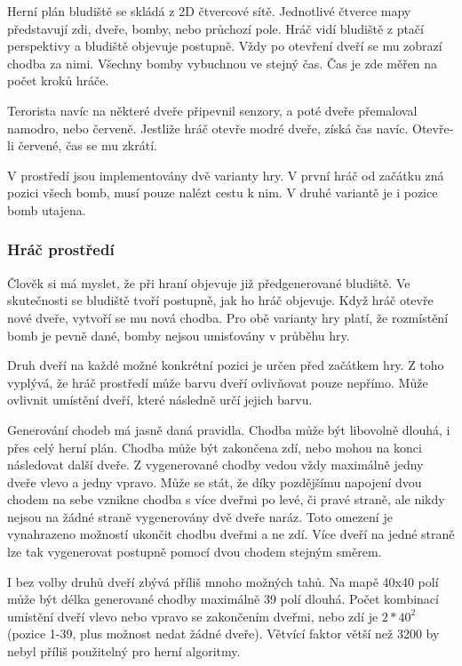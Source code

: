 Herní plán bludiště se skládá z 2D čtvercové sítě. Jednotlivé čtverce mapy představují zdi, dveře, bomby, nebo průchozí pole. Hráč vidí bludiště z ptačí perspektivy a bludiště objevuje postupně. Vždy po otevření dveří se mu zobrazí chodba za nimi. Všechny bomby vybuchnou ve stejný čas. Čas je zde měřen na počet kroků hráče.

Terorista navíc na některé dveře připevnil senzory, a poté dveře přemaloval namodro, nebo červeně. Jestliže hráč otevře modré dveře, získá čas navíc. Otevře-li červené, čas se mu zkrátí.

V prostředí jsou implementovány dvě varianty hry. V první hráč od začátku zná pozici všech bomb, musí pouze nalézt cestu k nim. V druhé variantě je i pozice bomb utajena.

\subsubsection{Hráč prostředí}

Člověk si má myslet, že při hraní objevuje již předgenerované bludiště. Ve skutečnosti se bludiště tvoří postupně, jak ho hráč objevuje. Když hráč otevře nové dveře, vytvoří se mu nová chodba. Pro obě varianty hry platí, že rozmístění bomb je pevně dané, bomby nejsou umisťovány v průběhu hry. 

Druh dveří na každé možné konkrétní pozici je určen před začátkem hry. Z toho vyplývá, že hráč prostředí může barvu dveří ovlivňovat pouze nepřímo. Může ovlivnit umístění dveří, které následně určí jejich barvu.

Generování chodeb má jasně daná pravidla. Chodba může být libovolně dlouhá, i přes celý herní plán. Chodba může být zakončena zdí, nebo mohou na konci následovat další dveře. Z vygenerované chodby vedou vždy maximálně jedny dveře vlevo a jedny vpravo. Může se stát, že díky pozdějšímu napojení dvou chodem na sebe vznikne chodba s více dveřmi po levé, či pravé straně, ale nikdy nejsou na žádné straně vygenerovány dvě dveře naráz. Toto omezení je vynahrazeno možností ukončit chodbu dveřmi a ne zdí. Více dveří na jedné straně lze tak vygenerovat postupně pomocí dvou chodem stejným směrem.

I bez volby druhů dveří zbývá příliš mnoho možných tahů. Na mapě 40x40 polí může být délka generované chodby maximálně 39 polí dlouhá. Počet kombinací umístění dveří vlevo nebo vpravo se zakončením dveřmi, nebo zdí je $2*40^2$ (pozice 1-39, plus možnost nedat žádné dveře). Větvící faktor větší než 3200 by nebyl příliš použitelný pro herní algoritmy. 

